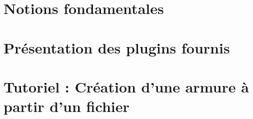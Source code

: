 \documentclass[a4paper]{report}
\begin{document}



\tableofcontents

\chapter{Notions fondamentales}


\chapter{Présentation des plugins fournis}


\chapter{Tutoriel : Création d'une armure à partir d'un fichier}

\end{document}

